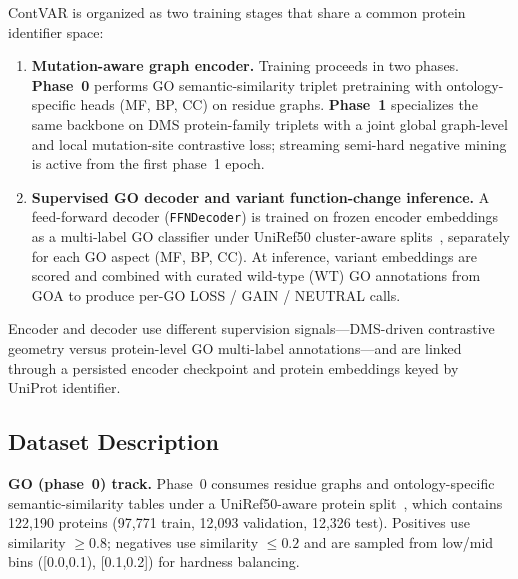 \documentclass[11pt,a4paper]{article}
\begin{document}
ContVAR is organized as two training stages that share a common protein identifier space:
\begin{enumerate}
    \item \textbf{Mutation-aware graph encoder.} Training proceeds in two phases. \textbf{Phase~0} performs GO semantic-similarity triplet pretraining with ontology-specific heads (MF, BP, CC) on residue graphs. \textbf{Phase~1} specializes the same backbone on DMS protein-family triplets with a joint global graph-level and local mutation-site contrastive loss; streaming semi-hard negative mining is active from the first phase~1 epoch.
    \item \textbf{Supervised GO decoder and variant function-change inference.} A feed-forward decoder (\texttt{FFNDecoder}) is trained on frozen encoder embeddings as a multi-label GO classifier under UniRef50 cluster-aware splits~\cite{suzek2015uniref}, separately for each GO aspect (MF, BP, CC). At inference, variant embeddings are scored and combined with curated wild-type (WT) GO annotations from GOA to produce per-GO LOSS / GAIN / NEUTRAL calls.
\end{enumerate}
Encoder and decoder use different supervision signals---DMS-driven contrastive geometry versus protein-level GO multi-label annotations---and are linked through a persisted encoder checkpoint and protein embeddings keyed by UniProt identifier.

\subsection{Dataset Description}
\label{sec:dataset-description}
\textbf{GO (phase~0) track.} Phase~0 consumes residue graphs and ontology-specific semantic-similarity tables under a UniRef50-aware protein split~\cite{suzek2015uniref}, which contains 122,190 proteins (97,771 train, 12,093 validation, 12,326 test). Positives use similarity $\geq 0.8$; negatives use similarity $\leq 0.2$ and are sampled from low/mid bins ([0.0,0.1), [0.1,0.2]) for hardness balancing. 
\end{document}
